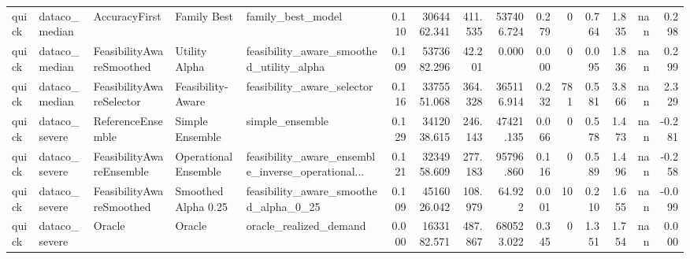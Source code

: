 \begin{table}
{\begin{tabular}{lllllrrrrrrrrrr}
   quick &  dataco\_median &             AccuracyFirst &           Family Best &                                  family\_best\_model & 0.110 &     3064462.341 &              411.535 &         537406.724 &                     0.279 &                   0 &                       0.764 &                  1.835 &               nan &                  0.298 \\
   quick &  dataco\_median &  FeasibilityAwareSmoothed &         Utility Alpha &           feasibility\_aware\_smoothed\_utility\_alpha & 0.109 &     5373682.296 &               42.201 &              0.000 &                     0.000 &                   0 &                       0.095 &                  1.836 &               nan &                  0.299 \\
   quick &  dataco\_median &  FeasibilityAwareSelector &     Feasibility-Aware &                         feasibility\_aware\_selector & 0.116 &     3375551.068 &              364.328 &         365116.914 &                     0.232 &                 781 &                       0.581 &                  3.866 &               nan &                  2.329 \\
   quick &  dataco\_severe &         ReferenceEnsemble &       Simple Ensemble &                                    simple\_ensemble & 0.129 &     3412038.615 &              246.143 &          47421.135 &                     0.066 &                   0 &                       0.578 &                  1.473 &               nan &                 -0.281 \\
   quick &  dataco\_severe &  FeasibilityAwareEnsemble &  Operational Ensemble &  feasibility\_aware\_ensemble\_inverse\_operational... & 0.121 &     3234958.609 &              277.183 &          95796.860 &                     0.116 &                   0 &                       0.589 &                  1.496 &               nan &                 -0.258 \\
   quick &  dataco\_severe &  FeasibilityAwareSmoothed &   Smoothed Alpha 0.25 &              feasibility\_aware\_smoothed\_alpha\_0\_25 & 0.109 &     4516026.042 &              108.979 &             64.922 &                     0.001 &                  10 &                       0.210 &                  1.655 &               nan &                 -0.099 \\
   quick &  dataco\_severe &                    Oracle &                Oracle &                             oracle\_realized\_demand & 0.000 &     1633182.571 &              487.867 &         680523.022 &                     0.345 &                   0 &                       1.351 &                  1.754 &               nan &                  0.000 \\

\end{tabular}}
\end{table}
